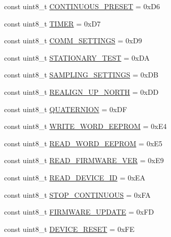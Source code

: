 \begin{DoxyCompactItemize}
\item 
const uint8\-\_\-t \hyperlink{namespace_u_s_u_a5bc881189e111127f0bd759100dbab6b}{\-C\-O\-N\-T\-I\-N\-U\-O\-U\-S\-\_\-\-P\-R\-E\-S\-E\-T} = 0x\-D6
\item 
const uint8\-\_\-t \hyperlink{namespace_u_s_u_abed08045a54f63e04380a2ac80bcaf79}{\-T\-I\-M\-E\-R} = 0x\-D7
\item 
const uint8\-\_\-t \hyperlink{namespace_u_s_u_a3709ea83b0ef142216dad235ed73a34b}{\-C\-O\-M\-M\-\_\-\-S\-E\-T\-T\-I\-N\-G\-S} = 0x\-D9
\item 
const uint8\-\_\-t \hyperlink{namespace_u_s_u_aa13337d52a46707f63911e7c2972971b}{\-S\-T\-A\-T\-I\-O\-N\-A\-R\-Y\-\_\-\-T\-E\-S\-T} = 0x\-D\-A
\item 
const uint8\-\_\-t \hyperlink{namespace_u_s_u_aeb8ec20b4bb74ff2895ab487c29810e0}{\-S\-A\-M\-P\-L\-I\-N\-G\-\_\-\-S\-E\-T\-T\-I\-N\-G\-S} = 0x\-D\-B
\item 
const uint8\-\_\-t \hyperlink{namespace_u_s_u_a9c5f8777b9c35aaaa0b64490d1f9a20d}{\-R\-E\-A\-L\-I\-G\-N\-\_\-\-U\-P\-\_\-\-N\-O\-R\-T\-H} = 0x\-D\-D
\item 
const uint8\-\_\-t \hyperlink{namespace_u_s_u_ad476e2e7f70dbe869e508f676bea92a9}{\-Q\-U\-A\-T\-E\-R\-N\-I\-O\-N} = 0x\-D\-F
\item 
const uint8\-\_\-t \hyperlink{namespace_u_s_u_a483eb9b7abe528d9fe3e843b4655a977}{\-W\-R\-I\-T\-E\-\_\-\-W\-O\-R\-D\-\_\-\-E\-E\-P\-R\-O\-M} = 0x\-E4
\item 
const uint8\-\_\-t \hyperlink{namespace_u_s_u_ac9d01a02c622d06449580697749db1f5}{\-R\-E\-A\-D\-\_\-\-W\-O\-R\-D\-\_\-\-E\-E\-P\-R\-O\-M} = 0x\-E5
\item 
const uint8\-\_\-t \hyperlink{namespace_u_s_u_a7d0e77d37d6107d2869c30f57412e8b0}{\-R\-E\-A\-D\-\_\-\-F\-I\-R\-M\-W\-A\-R\-E\-\_\-\-V\-E\-R} = 0x\-E9
\item 
const uint8\-\_\-t \hyperlink{namespace_u_s_u_ad810b0281ab629302e9fd716374b90ed}{\-R\-E\-A\-D\-\_\-\-D\-E\-V\-I\-C\-E\-\_\-\-I\-D} = 0x\-E\-A
\item 
const uint8\-\_\-t \hyperlink{namespace_u_s_u_ae7447325a101912b787905199c4f2acb}{\-S\-T\-O\-P\-\_\-\-C\-O\-N\-T\-I\-N\-U\-O\-U\-S} = 0x\-F\-A
\item 
const uint8\-\_\-t \hyperlink{namespace_u_s_u_a321d286cf60a5fd674ad8c0286db8748}{\-F\-I\-R\-M\-W\-A\-R\-E\-\_\-\-U\-P\-D\-A\-T\-E} = 0x\-F\-D
\item 
const uint8\-\_\-t \hyperlink{namespace_u_s_u_a7c9f78c9bb18ba92a529bf5819f6a5d2}{\-D\-E\-V\-I\-C\-E\-\_\-\-R\-E\-S\-E\-T} = 0x\-F\-E
\end{DoxyCompactItemize}


